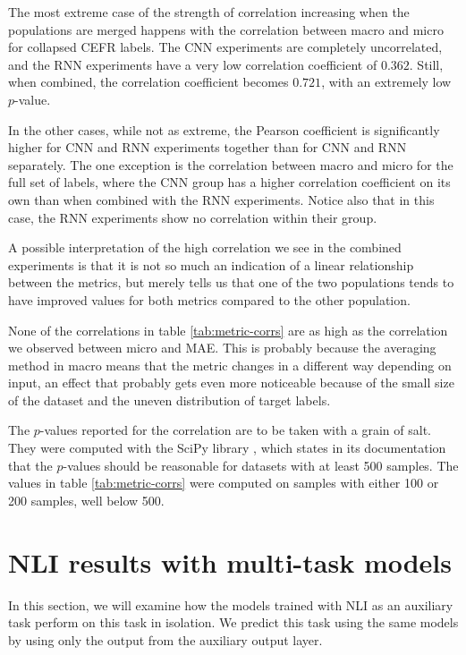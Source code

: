 The most extreme case of the strength of correlation increasing when the
populations are merged happens with the correlation between macro \FI and
micro \FI for collapsed CEFR labels. The CNN experiments are completely
uncorrelated, and the RNN experiments have a very low correlation coefficient
of $0.362$. Still, when combined, the correlation coefficient becomes
$0.721$, with an extremely low $p$-value.

In the other cases, while not as extreme, the Pearson coefficient is
significantly higher for CNN and RNN experiments together than for CNN and
RNN separately. The one exception is the correlation between macro \FI and
micro \FI for the full set of labels, where the CNN group has a higher
correlation coefficient on its own than when combined with the RNN
experiments. Notice also that in this case, the RNN experiments show no
correlation within their group.

A possible interpretation of the high correlation we see in the combined
experiments is that it is not so much an indication of a linear relationship
between the metrics, but merely tells us that one of the two populations
tends to have improved values for both metrics compared to the other
population.

None of the correlations in table \ref{tab:metric-corrs} are as high as the
correlation we observed between micro \FI and \ac{MAE}. This is probably
because the averaging method in macro \FI means that the metric changes in a
different way depending on input, an effect that probably gets even more
noticeable because of the small size of the dataset and the uneven
distribution of target labels.

The $p$-values reported for the correlation are to be taken with a grain of
salt. They were computed with the SciPy library \autocite{scipy}, which
states in its documentation that the $p$-values should be reasonable
for datasets with at least 500 samples. The values in table
\ref{tab:metric-corrs} were computed on samples with either 100 or 200
samples, well below 500.


\section{NLI results with multi-task models}

In this section, we will examine how the models trained with \ac{NLI} as an
auxiliary task perform on this task in isolation. We predict this task using
the same models by using only the output from the auxiliary output layer.

